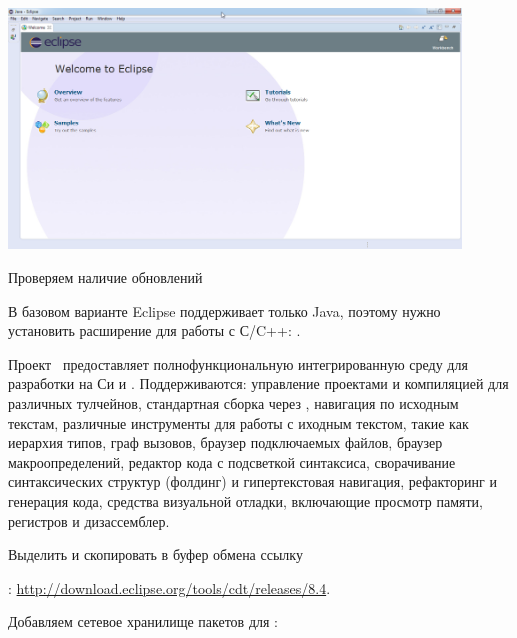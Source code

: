 \bigskip{}

\bigskip\includegraphics[width=0.9\textwidth]{fig/EclipseMain.png}

\bigskip Проверяем наличие обновлений

\bigskip{}

\bigskip В базовом варианте Eclipse поддерживает только Java, поэтому нужно
установить расширение для работы с С/C++: .

\bigskip
Проект \ предоставляет полнофункциональную интегрированную среду
для разработки на Си и \cpp. Поддерживаются: управление проектами и
компиляцией для различных тулчейнов, стандартная сборка через
, навигация по исходным текстам, различные инструменты для
работы с иходным текстом, такие как иерархия типов, граф вызовов, браузер
подключаемых файлов, браузер макроопределений, редактор кода с подсветкой
синтаксиса, сворачивание синтаксических структур (фолдинг) и гипертекстовая
навигация, рефакторинг и генерация кода, средства визуальной отладки,
включающие просмотр памяти, регистров и дизассемблер.

\bigskip{}

\bigskip Выделить и скопировать в буфер обмена ссылку

:
\url{http://download.eclipse.org/tools/cdt/releases/8.4}.

\bigskip Добавляем сетевое хранилище пакетов для \eclipse:

\bigskip{}

\bigskip{}


